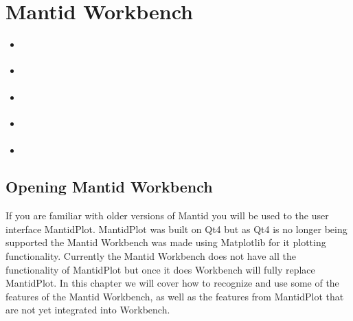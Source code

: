 \documentclass[letterpaper,10pt,english,openany]{sphinxmanual}
\begin{document}
\section{Mantid Workbench}
\label{\detokenize{mantid_basic_course/using_workbench/index:mantid-workbench}}\label{\detokenize{mantid_basic_course/using_workbench/index:using-workbench}}\label{\detokenize{mantid_basic_course/using_workbench/index::doc}}
\begin{itemize}
\item {} 
{\hyperref[\detokenize{mantid_basic_course/using_workbench/01_opening_mantid_workbench:opening-mantid-workbench}]{}}

\item {} 
{\hyperref[\detokenize{mantid_basic_course/using_workbench/02_plotting_in_workbench:plotting-in-workbench}]{}}

\item {} 
{\hyperref[\detokenize{mantid_basic_course/using_workbench/03_Working_with_Python_in_Workbench:working-with-python-in-workbench}]{}}

\item {} 
{\hyperref[\detokenize{mantid_basic_course/using_workbench/04_What_is_missing:what-is-missing}]{}}

\item {} 
{\hyperref[\detokenize{mantid_basic_course/using_workbench/05_Exercises:exercises}]{}}

\end{itemize}


\subsection{Opening Mantid Workbench}
\label{\detokenize{mantid_basic_course/using_workbench/01_opening_mantid_workbench:opening-mantid-workbench}}\label{\detokenize{mantid_basic_course/using_workbench/01_opening_mantid_workbench:id1}}\label{\detokenize{mantid_basic_course/using_workbench/01_opening_mantid_workbench::doc}}
If you are familiar with older versions of Mantid you will be used to the user interface MantidPlot. MantidPlot was built
on Qt4 but as Qt4 is no longer being supported the Mantid Workbench was made using Matplotlib for it plotting functionality.
Currently the Mantid Workbench does not have all the functionality of MantidPlot but once it does Workbench will fully
replace MantidPlot.
In this chapter we will cover how to recognize and use some of the features of the Mantid Workbench, as well as the features
from MantidPlot that are not yet integrated into Workbench.
\end{document}
